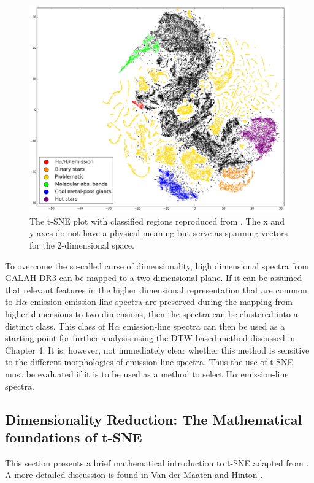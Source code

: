 \begin{figure}[!htb]
\centering
\includegraphics[scale=0.40]{figures/tsne traven.png}
\caption{The t-SNE plot with classified regions reproduced from \citet{traven2017galah}. The x and y axes do not have a physical meaning but serve as spanning vectors for the 2-dimensional space.}
\label{fig5.1}
\end{figure}

To overcome the so-called curse of dimensionality, high dimensional spectra from GALAH DR3 can be mapped to a two dimensional plane. If it can be assumed that relevant features in the higher dimensional representation that are common to H$\alpha$ emission emission-line spectra are preserved during the mapping from higher dimensions to two dimensions, then the spectra can be clustered into a distinct class. This class of H$\alpha$ emission-line spectra can then be used as a starting point for further analysis using the DTW-based method discussed in Chapter 4. It is, however, not immediately clear whether this method is sensitive to the different morphologies of emission-line spectra. Thus the use of t-SNE must be evaluated if it is to be used as a method to select H$\alpha$ emission-line spectra.

\subsection{Dimensionality Reduction: The Mathematical foundations of t-SNE}

This section presents a brief mathematical introduction to t-SNE adapted from \citet{traven2017galah}. A more detailed discussion is found in Van der Maaten and Hinton \citep{van2008visualizing}. 

